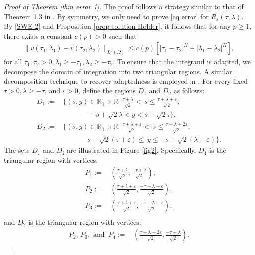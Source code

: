 \documentclass[11pt,reqno]{amsart}
\numberwithin{equation}{section}
\newcommand{\1}{{\bf 1}}
\newcommand{\2}{{\bf 2}}
\begin{document}
\begin{proof}[Proof of Theorem \ref{thm error 1}]    
The proof follows a strategy similar to that of   Theorem 1.3 in \cite{HOO2024}.   By symmetry, we only need to prove \eqref{eq error} for $R_{\varepsilon}(\tau, \lambda)$.   By  \eqref{SWE 2}  and Proposition \ref{prop solution Holder},  it follows  that for any   $p\ge1$, there exists a constant $c(p)>0$ such that
\begin{align}\label{eq Holder v}
\|v(\tau_1, \lambda_1)-v(\tau_2, \lambda_2)\|_{L^p(\Omega)}\le c(p)\left[|\tau_1-\tau_2|^{H}+|\lambda_1-\lambda_2|^{H}\right],
\end{align}
 for all $\tau_1, \tau_2>0, \lambda_1\ge -\tau_1, \lambda_2\ge -\tau_2$.
  To ensure that   the integrand is  adapted, we decompose the domain of integration into two triangular regions. A     similar decomposition technique  to recover adaptedness is employed  in \cite[pp. 21]{CHKK19}.  For every fixed $\tau>0, \lambda\ge -\tau$, and $\varepsilon>0$, define  the regions $D_1$ and $D_2$ as follows: 
\begin{align*}
D_1:= & \, \Bigg\{(s, y)\in \mathbb R_+\times \mathbb R:\,  \frac{\tau+\lambda}{\sqrt 2} <  \,  s\le \frac{\tau+\lambda+\varepsilon}{\sqrt 2},\\
 & \,\,\,\,\,\,\,\,\,\,\,    \,\,\,\,\,\,\,\,\,\,\,  -s+\sqrt{2}\lambda <  y < s-\sqrt{2}\tau \Bigg\},\\
D_2:=&  \, \Bigg\{(s,y)\in \mathbb R_+\times \mathbb R :\,  \frac{\tau+\lambda+\varepsilon}{\sqrt 2} <  \, s \le \frac{\tau+\lambda+2\varepsilon}{\sqrt 2},\\
 & \,\,\,\,\,\,\,\,\,\,\,    \,\,\,\,\,\,\,\,\,\,\,    s-\sqrt{2}(\tau+\varepsilon)\le \, y\le -s+\sqrt 2(\lambda+ \varepsilon) \Bigg\}.
\end{align*}
 The  sets $D_1$ and $D_2$ are  illustrated in Figure \ref{fig2}. Specifically,   $D_1$ is the triangular region with vertices:
\begin{equation}\label{eq P}
\begin{split}  
   P_1 :=&\, \left(\frac{\tau+\lambda}{\sqrt 2}, \frac{-\tau+\lambda}{\sqrt 2}\right),\\
     P_2:=&\,  \left(\frac{\tau+\lambda+\varepsilon}{\sqrt 2}, \frac{-\tau+\lambda-\varepsilon}{\sqrt 2}\right),\\
P_3:=&\, \left(\frac{\tau+\lambda+\varepsilon}{\sqrt 2}, \frac{-\tau+\lambda+\varepsilon}{\sqrt 2}\right),\\
  \end{split}  
\end{equation}
and $D_2$ is the triangular region with vertices:
\begin{align*}
 P_2 , \, P_3,  \text{ and }\  P_4 :=&\,  \left(\frac{\tau+\lambda+2\varepsilon}{\sqrt 2}, \frac{-\tau+\lambda}{\sqrt 2}\right).
\end{align*}


\end{proof}
\end{document}

